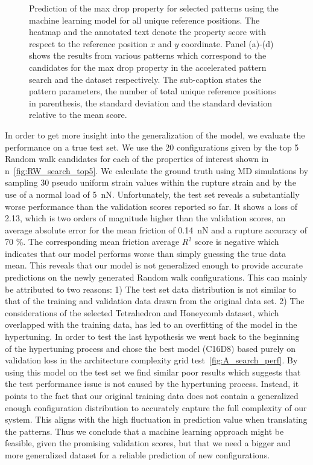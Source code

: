 \begin{figure}[!htb]
\begin{subfigure}[t]{0.49\textwidth}
  \end{subfigure}
  \hfill
  \caption{Prediction of the max drop property for selected patterns using the machine learning model for all unique reference positions. The heatmap and the annotated text denote the property score with respect to the reference position $x$ and $y$ coordinate. Panel (a)-(d) shows the results from various patterns which correspond to the candidates for the max drop property in the accelerated pattern search and the dataset respectively. The sub-caption states the pattern parameters, the number of total unique reference positions in parenthesis, the standard deviation and the standard deviation relative to the mean score. }
  \label{fig:ref_search_top_data}
\end{figure}


In order to get more insight into the generalization of the model, we evaluate
the performance on a true test set. We use the 20 configurations given by the
top 5 Random walk candidates for each of the properties of interest shown in
n~\cref{fig:RW_search_top5}. We calculate the ground truth using \acrshort{MD}
simulations by sampling 30 pseudo uniform strain values within the rupture
strain and by the use of a normal load of \SI{5}{nN}. Unfortunately, the test
set reveals a substantially worse performance than the validation scores
reported so far. It shows a loss of 2.13, which is two orders of magnitude
higher than the validation scores, an average absolute error for the mean
friction of \SI{0.14}{nN} and a rupture accuracy of 70 \%. The corresponding
mean friction average $R^2$ score is negative which indicates that our model
performs worse than simply guessing the true data mean. This reveals that our
model is not generalized enough to provide accurate predictions on the newly
generated Random walk configurations. This can mainly be attributed to two
reasons: 1) The test set data distribution is not similar to that of the
training and validation data drawn from the original data set. 2) The
considerations of the selected Tetrahedron and Honeycomb dataset, which
overlapped with the training data, has led to an overfitting of the model in the
hypertuning. In order to test the last hypothesis we went back to the beginning
of the hypertuning process and chose the best model (C16D8) based purely on
validation loss in the architecture complexity grid
test~\cref{fig:A_search_perf}. By using this model on the test set we find
similar poor results which suggests that the test performance issue is not
caused by the hypertuning process. Instead, it points to the fact that our
original training data does not contain a generalized enough configuration distribution to accurately capture the full complexity of our system. This aligns with the high
fluctuation in prediction value when translating the patterns. Thus we conclude
that a machine learning approach might be feasible, given the promising
validation scores, but that we need a bigger and more generalized dataset for a
reliable prediction of new configurations. 



